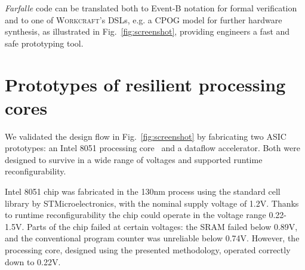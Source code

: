 \documentclass[conference]{IEEEtran}
\begin{document}
\emph{Farfalle} code can be translated both to Event-B notation for formal
verification and to one of \textsc{Workcraft}'s DSLs, e.g. a CPOG model for
further hardware synthesis, as illustrated in Fig.~\ref{fig:screenshot},
providing engineers a fast and safe prototyping tool.

\vspace{-0.5mm}
\section{Prototypes of resilient processing cores\label{sec:experience}}
\vspace{-0.5mm}



We validated the design flow in Fig.~\ref{fig:screenshot} by fabricating two
ASIC prototypes: an Intel 8051 processing core~\cite{rec-proc} and a dataflow
accelerator. Both were designed to survive in a wide range of voltages and supported
runtime reconfigurability.

Intel 8051 chip was fabricated in the 130nm process using the standard cell
library by STMicroelectronics, with the nominal supply voltage of 1.2V. Thanks
to runtime reconfigurability the chip could operate
in the voltage range 0.22-1.5V. Parts of the chip failed at certain voltages:
the SRAM failed below 0.89V, and the
conventional program counter was unreliable below 0.74V. However, the
processing core, designed using the presented methodology, operated
correctly down to 0.22V.
\end{document}
